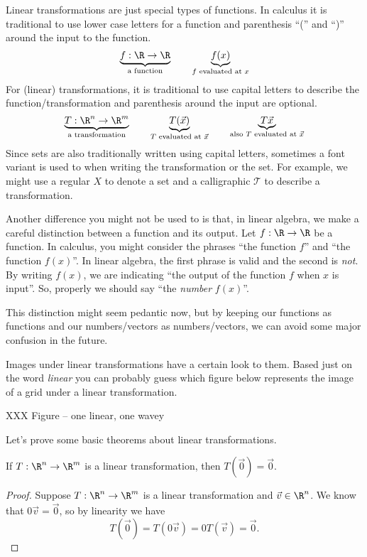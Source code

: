 
Linear transformations are just special types of functions. In calculus it is traditional to use lower case
letters for a function and parenthesis ``('' and ``)'' around the input to the function.
\[
	\underbrace{f:\R\to\R}_{\text{a function}}\qquad \underbrace{f(x)}_{\text{$f$ evaluated at $x$}}
\]
For (linear) transformations, it is traditional to use capital letters to describe the function/transformation
and parenthesis around the input are optional.
\[
	\underbrace{T:\R^n\to\R^m}_{\text{a transformation}}\qquad \underbrace{T(\vec x)}_{\text{$T$ evaluated at $\vec x$}}
	\qquad
	\underbrace{T\vec x}_{\text{also $T$ evaluated at $\vec x$}}
\]
Since sets are also traditionally written using capital letters, sometimes a font variant is used to when writing the transformation
or the set. For example, we might use a regular $X$ to denote a set and a calligraphic $\mathcal T$ to describe a transformation.

\bigskip

Another difference you might not be used to is that, in linear algebra, we make a careful distinction between
a function and its output. Let $f:\R\to\R$ be a function. In calculus, you might consider the phrases ``the function $f$''
and ``the function $f(x)$''. In linear algebra, the first phrase is valid and the second is \emph{not}. By writing
$f(x)$, we are indicating ``the output of the function $f$ when $x$ is input''. So, properly we should say ``the \emph{number} $f(x)$''.

This distinction might seem pedantic now, but by keeping our functions as functions and our numbers/vectors as numbers/vectors,
we can avoid some major confusion in the future.



Images under linear transformations have a certain look to them. Based just on the word
\emph{linear} you can probably guess which figure below represents the image of a grid under
a linear transformation.

XXX Figure -- one linear, one wavey

Let's prove some basic theorems about linear transformations.

\begin{theorem}
	If $T:\R^n\to\R^m$ is a linear transformation, then $T(\vec 0)=\vec 0$.
\end{theorem}
\begin{proof}
	Suppose $T:\R^n\to\R^m$ is a linear transformation and $\vec v\in \R^n$. We know
	that $0\vec v=\vec 0$, so by linearity we have
	\[
		T(\vec 0)=T(0\vec v)=0T(\vec v)=\vec 0.
	\]
\end{proof}

